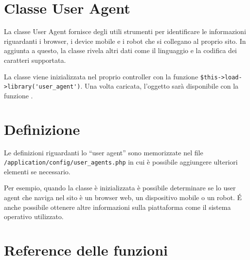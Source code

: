 \section{Classe User Agent}
\label{class:useragent}

La classe User Agent fornisce degli utili strumenti per identificare le informazioni riguardanti i browser, i device mobile e i robot che si collegano al proprio sito. In aggiunta a questo, la classe rivela altri dati come il linguaggio e la codifica dei caratteri supportata.

La classe viene inizializzata nel proprio controller con la funzione \verb|$this->load->library('user_agent')|. Una volta caricata, l'oggetto sarà disponibile con la funzione .

\section*{Definizione}

Le definizioni riguardanti lo ``user agent'' sono memorizzate nel file \verb|/application/config/user_agents.php| in cui è possibile aggiungere ulteriori elementi se necessario.

Per esempio, quando la classe è inizializzata è possibile determinare se lo user agent che naviga nel sito è un browser web, un dispositivo mobile o un robot. \'E anche possibile ottenere altre informazioni sulla piattaforma come il sistema operativo utilizzato.


\section*{Reference delle funzioni}

